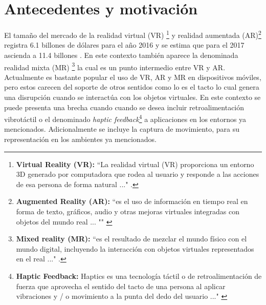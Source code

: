 \section{Antecedentes y motivación}

El tamaño del mercado de la realidad virtual (VR) \footnote{\textbf{Virtual Reality (VR):}  ``La realidad virtual (VR) proporciona un entorno 3D generado por computadora que rodea al usuario y responde a las acciones de esa persona de forma natural ..." \cite{gartner-group-VR}.}  y realidad aumentada (AR)\footnote{\textbf{Augmented Reality (AR):} ``es el uso de información en tiempo real en forma de texto, gráficos, audio y otras mejoras virtuales integradas con objetos del mundo real ... "" \citep{gartner-group-AR}} registra 6.1 billones de dólares para el año 2016 y se estima que para el 2017 ascienda a 11.4 billones \citep{statista-VR-AR}.  En este contexto también aparece la denominada realidad mixta (MR) \footnote{\textbf{Mixed reality (MR):} ``es el resultado de mezclar el mundo físico con el mundo digital,  incluyendo la interacción con objetos virtuales representados en el real ..." \citep{microsoft-MR}.} la cual es un punto intermedio entre VR y AR.  Actualmente es bastante popular el  uso de VR, AR y MR en dispositivos móviles, pero estos carecen del soporte de otros sentidos como lo es el tacto lo cual genera una disrupción cuando se interactúa con los objetos virtuales. En este contexto se puede presenta una brecha cuando cuando se desea incluir retroalimentación vibrotáctil o el denominado \textit{haptic feedback}\footnote{\textbf{Haptic Feedback:} Haptics es una tecnología táctil o de retroalimentación de fuerza que aprovecha el sentido del tacto de una persona al aplicar vibraciones y / o movimiento a la punta del dedo del usuario ..." \citep{gartner-group-haptics}} a aplicaciones en los entornos ya mencionados. Adicionalmente se incluye la captura de movimiento, para su representación en  los ambientes ya mencionados.

